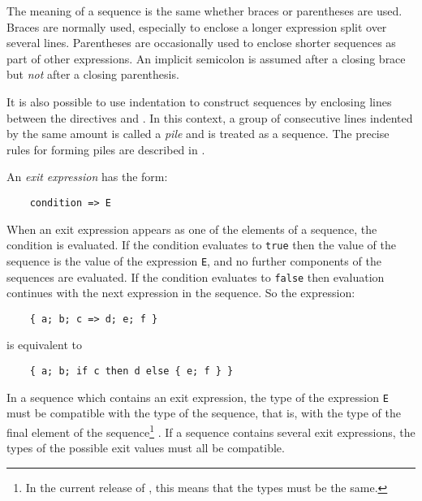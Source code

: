 The meaning of a sequence is the same whether braces or parentheses are
used.  Braces are normally used, especially to enclose a longer
expression split over several lines.  Parentheses are occasionally used
to enclose shorter sequences as part of other expressions.  An implicit
semicolon is assumed after a closing brace but {\em not} after a closing
parenthesis.

It is also possible to use indentation to construct sequences
by enclosing lines between the directives  and .
In this context, a group of consecutive lines indented by the same amount
is called a {\em pile\/} and is treated as a sequence.
The precise rules for forming piles are described in .


An {\em exit expression} has the form:

\begin{small}
\begin{verbatim}
    condition => E
\end{verbatim}
\end{small}

When an exit expression appears as one of the elements of a sequence,
the condition is evaluated.  If the condition evaluates to \verb"true"
then the value of the sequence is the value of the expression \verb"E",
and no further components of the sequences are evaluated.
If the condition evaluates to \verb"false" then evaluation continues with
the next expression in the sequence.  So the expression:

\begin{small}
\begin{verbatim}
    { a; b; c => d; e; f }
\end{verbatim}
\end{small}

is equivalent to

\begin{small}
\begin{verbatim}
    { a; b; if c then d else { e; f } }
\end{verbatim}
\end{small}

In a sequence which contains an exit expression, the type of the expression
\verb"E" must be compatible with the type of the sequence, that is, with
the type of the final element of the sequence\footnote{In the current release of
\asharp{}, this means that the types must be the same.}%
.  If a sequence contains several exit expressions,
the types of the possible exit values must
all be compatible.

